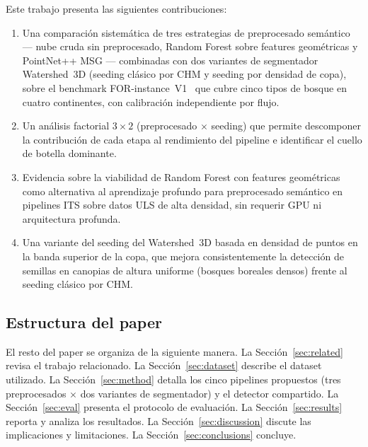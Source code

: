 \documentclass[runningheads]{llncs}
\begin{document}
Este trabajo presenta las siguientes contribuciones:

\begin{enumerate}
  \item Una comparaci\'on sistem\'atica de tres estrategias de preprocesado sem\'antico --- nube cruda sin preprocesado, Random Forest sobre features geom\'etricas y PointNet++ MSG --- combinadas con dos variantes de segmentador Watershed~3D (seeding cl\'asico por CHM y seeding por densidad de copa), sobre el benchmark FOR-instance~V1~\cite{puliti2023} que cubre cinco tipos de bosque en cuatro continentes, con calibraci\'on independiente por flujo.

  \item Un an\'alisis factorial $3 \times 2$ (preprocesado $\times$ seeding) que permite descomponer la contribuci\'on de cada etapa al rendimiento del pipeline e identificar el cuello de botella dominante.

  \item Evidencia sobre la viabilidad de Random Forest con features geom\'etricas como alternativa al aprendizaje profundo para preprocesado sem\'antico en pipelines ITS sobre datos ULS de alta densidad, sin requerir GPU ni arquitectura profunda.

  \item Una variante del seeding del Watershed~3D basada en densidad de puntos en la banda superior de la copa, que mejora consistentemente la detecci\'on de semillas en canopias de altura uniforme (bosques boreales densos) frente al seeding cl\'asico por CHM.
\end{enumerate}

\subsection{Estructura del paper}

El resto del paper se organiza de la siguiente manera. La Secci\'on~\ref{sec:related} revisa el trabajo relacionado. La Secci\'on~\ref{sec:dataset} describe el dataset utilizado. La Secci\'on~\ref{sec:method} detalla los cinco pipelines propuestos (tres preprocesados $\times$ dos variantes de segmentador) y el detector compartido. La Secci\'on~\ref{sec:eval} presenta el protocolo de evaluaci\'on. La Secci\'on~\ref{sec:results} reporta y analiza los resultados. La Secci\'on~\ref{sec:discussion} discute las implicaciones y limitaciones. La Secci\'on~\ref{sec:conclusions} concluye.

\end{document}

